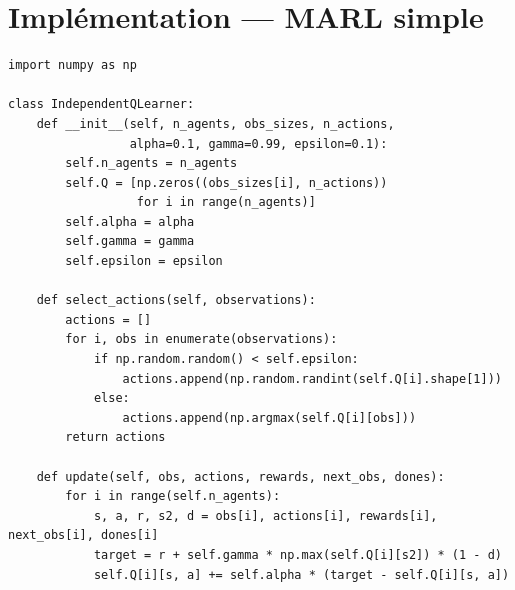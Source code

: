 \section{Impl\'ementation --- MARL simple}

\begin{codeblock}[title=\textbf{Independent Q-Learning multi-agents}]
\begin{verbatim}
import numpy as np

class IndependentQLearner:
    def __init__(self, n_agents, obs_sizes, n_actions,
                 alpha=0.1, gamma=0.99, epsilon=0.1):
        self.n_agents = n_agents
        self.Q = [np.zeros((obs_sizes[i], n_actions))
                  for i in range(n_agents)]
        self.alpha = alpha
        self.gamma = gamma
        self.epsilon = epsilon

    def select_actions(self, observations):
        actions = []
        for i, obs in enumerate(observations):
            if np.random.random() < self.epsilon:
                actions.append(np.random.randint(self.Q[i].shape[1]))
            else:
                actions.append(np.argmax(self.Q[i][obs]))
        return actions

    def update(self, obs, actions, rewards, next_obs, dones):
        for i in range(self.n_agents):
            s, a, r, s2, d = obs[i], actions[i], rewards[i], next_obs[i], dones[i]
            target = r + self.gamma * np.max(self.Q[i][s2]) * (1 - d)
            self.Q[i][s, a] += self.alpha * (target - self.Q[i][s, a])
\end{verbatim}
\end{codeblock}

